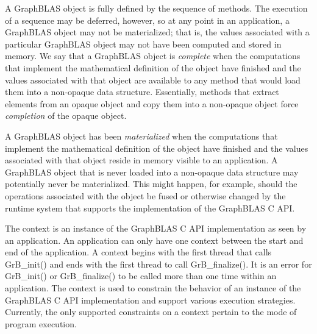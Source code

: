 A GraphBLAS object is fully defined by the sequence of methods.   
The execution of a sequence may be deferred, however, so at any point 
in an application, a GraphBLAS object may not be materialized; that is, 
the values associated with a particular GraphBLAS object may not have 
been computed and stored in memory.   We say that a GraphBLAS object is \emph{complete} 
when the computations that implement the mathematical definition of the object have 
finished and the values associated with that object are available to any method that would 
load them into a non-opaque data structure.   Essentially, methods that extract elements 
from an opaque object and copy them into a non-opaque object force \emph{completion} of the
opaque object. 

 A GraphBLAS object has been \emph{materialized} when 
the computations that implement the mathematical definition of the object 
have finished and the values associated with that object reside in memory visible to an application.   
A GraphBLAS object that is never loaded into a non-opaque data structure may 
potentially never be materialized.  This might happen, for  example, should the operations 
associated with the object be fused or otherwise changed by the runtime system 
that supports the implementation of the GraphBLAS C API.   

  The context is an instance of the GraphBLAS C API implementation
as seen by an application.  An application can only have one context between the 
start and end of the application.  
A context begins with the first thread that calls {\sf GrB\_init()} and ends with the 
first thread to call {\sf GrB\_finalize()}.  
It is an error for {\sf GrB\_init()} or {\sf GrB\_finalize()} to be called more than one
time within an application.  The context is used to constrain the behavior of an
instance of the GraphBLAS C API implementation and support various execution strategies.
Currently, the only
supported constraints on a context pertain to the mode of program execution.



